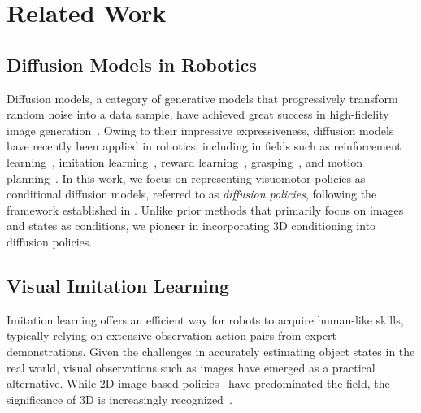 \section{Related Work}
\subsection{Diffusion Models in Robotics}
Diffusion models, a category of generative models that progressively transform random noise into a data sample, have achieved great success in high-fidelity image generation~\citep{ho2020ddpm, song2020score, rombach2022stable_diffusion,song2020ddim}. Owing to their impressive expressiveness, diffusion models have recently been applied in robotics, including in fields such as reinforcement learning~\citep{wang2022diffusion_QL,ajay2022conditional_generative_modeling}, imitation learning~\citep{chi2023diffusion_policy, pearce2023imitating_diffusion, reuss2023goal,xian2023chaineddiffuser,sridhar2024memoryconsistent,prasad2024consistency}, reward learning~\citep{Huang2023DiffusionReward,nuti2023extracting}, grasping~\citep{wu2023graspGF,urain2023se3,simeonov2023shelving}, and motion planning~\citep{saha2023edmp,janner2022diffusion_planning}. In this work, we focus on representing visuomotor policies as conditional diffusion models, referred to as \textit{diffusion policies}, following the framework established in \citep{chi2023diffusion_policy,pearce2023imitating_diffusion}. Unlike prior methods that primarily focus on images and states as conditions, we pioneer in incorporating 3D conditioning into diffusion policies.

\subsection{Visual Imitation Learning}
\label{section: visual imitation learning}
Imitation learning offers an efficient way for robots to acquire human-like skills, typically relying on extensive observation-action pairs from expert demonstrations. Given the challenges in accurately estimating object states in the real world, visual observations such as images have emerged as a practical alternative. While 2D image-based policies~\citep{pari2021VINN,florence2022ibc,chi2023diffusion_policy,mandlekar2021robomimic,haldar2023fish, shafiullah2022bet, wang2023mimicplay,ha2023scaling} have predominated the field, the significance of 3D is increasingly recognized~\citep{shridhar2023peract,ze2023gnfactor,Ze2022rl3d,goyal2023rvt,gervet2023act3d,3d_diffuser_actor,wang2024dexcap}.


